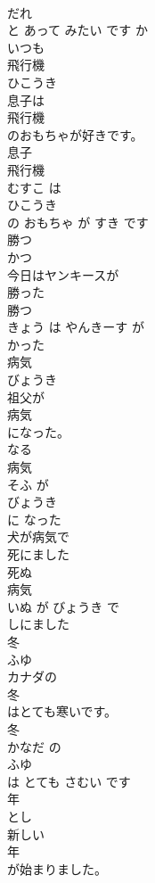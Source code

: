 \documentclass[8pt]{extreport}
\begin{document}
\begin{CJK}{UTF8}{min}
\\	だれ
\\	と あって みたい です か	
\\	いつも	
\\	飛行機	
\\	ひこうき	
\\	息子は
\\	飛行機
\\	のおもちゃが好きです。	
\\	息子 
\\	飛行機 
\\	むすこ は 
\\	ひこうき
\\	の おもちゃ が すき です	
\\	勝つ	
\\	かつ	
\\	今日はヤンキースが
\\	勝った
\\	勝つ 
\\	きょう は やんきーす が 
\\	かった
\\	病気	
\\	びょうき	
\\	祖父が
\\	病気
\\	になった。	
\\	なる 
\\	病気 
\\	そふ が 
\\	びょうき
\\	に なった	
\\	犬が病気で
\\	死にました
\\	死ぬ 
\\	病気 
\\	いぬ が びょうき で 
\\	しにました
\\	冬	
\\	ふゆ	
\\	カナダの
\\	冬
\\	はとても寒いです。	
\\	冬 
\\	かなだ の 
\\	ふゆ
\\	は とても さむい です	
\\	年	
\\	とし	
\\	新しい
\\	年
\\	が始まりました。	

\end{CJK}
\end{document}
